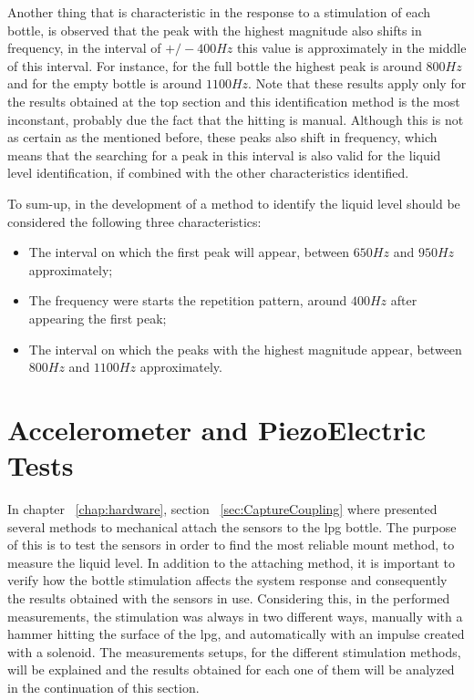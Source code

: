 Another thing that is characteristic in the response to a stimulation of each bottle, is observed that the peak with the highest magnitude also shifts in frequency, in the interval of $+/-400Hz$ this value is approximately in the middle of this interval. For instance, for the full bottle the highest peak is around $800Hz$ and for the empty bottle is around $1100Hz$. Note that these results apply only for the results obtained at the top section and this identification method is the most inconstant, probably due the fact that the hitting is manual. Although this is not as certain as the mentioned before, these peaks also shift in frequency, which means that the searching for a peak in this interval is also valid for the liquid level identification, if combined with the other characteristics identified.

To sum-up, in the development of a method to identify the liquid level should be considered the following three characteristics:
\begin{itemize}
    \item The interval on which the first peak will appear, between $650Hz$ and $950Hz$ approximately;
    \item The frequency were starts the repetition pattern, around $400Hz$ after appearing the first peak;
    \item The interval on which the peaks with the highest magnitude appear, between $800Hz$ and $1100Hz$ approximately. 
\end{itemize}

\section{Accelerometer and PiezoElectric Tests}
In chapter ~\ref{chap:hardware}, section ~\ref{sec:CaptureCoupling} where presented several methods to mechanical attach the sensors to the \acrshort{lpg} bottle. The purpose of this is to test the sensors in order to find the most reliable mount method, to measure the liquid level. 
In addition to the attaching method, it is important to verify how the bottle stimulation affects the system response and consequently the results obtained with the sensors in use. Considering this, in the performed measurements, the stimulation was always in two different ways, manually with a hammer hitting the surface of the \acrshort{lpg}, and automatically with an impulse created with a solenoid. The measurements setups, for the different stimulation methods, will be explained and the results obtained for each one of them will be analyzed in the continuation of this section.
